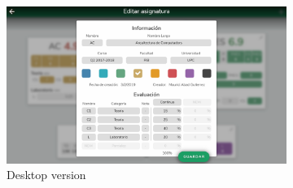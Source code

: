 \vfill
\begin{figure}[ht!]
    \begin{subfigure}[b]{0.757\textwidth-0.1cm}
        \centering
        \includegraphics[width=\textwidth]{media/screenshots/screenshot-edit-pc.png}
        \caption{Desktop version}
    \end{subfigure}
    \hfill
    \begin{subfigure}[b]{0.243\textwidth-0.1cm}
        \centering

\end{subfigure}
\end{figure}
